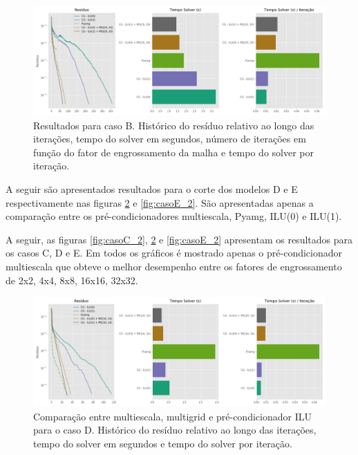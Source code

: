 \begin{figure}[!htbp]
\label{fig:reservatorio320x320_2}
\centering
\includegraphics[width=\textwidth]{chap08/figs/reservatorio320x320_2.png}
\caption{Resultados para caso B. Histórico do resíduo relativo ao longo das iterações, tempo do solver em segundos, número de iterações em função do fator de engrossamento da malha e tempo do solver por iteração. }
\end{figure}


A seguir são apresentados resultados para o corte dos modelos D e E respectivamente nas figuras \ref{fig:casoD_2} e \ref{fig:casoE_2}. 
São apresentadas apenas a comparação entre os pré-condicionadores multiescala, Pyamg, ILU(0) e ILU(1). 


A seguir, as figuras \ref{fig:casoC_2}, \ref{fig:casoD_2} e \ref{fig:casoE_2} apresentam os resultados para os casos C, D e E. 
Em todos os gráficos é mostrado apenas o pré-condicionador multiescala que obteve o melhor desempenho entre os fatores de engrossamento de 2x2, 4x4, 8x8, 16x16, 32x32.



\begin{figure}[!htbp]
\label{fig:casoD_2}
\centering
\includegraphics[width=\textwidth]{chap08/figs/casoD_2.png}
\caption{Comparação entre multiescala, multigrid e pré-condicionador ILU para o caso D. Histórico do resíduo relativo ao longo das iterações, tempo do solver em segundos e tempo do solver por iteração. }
\end{figure}

